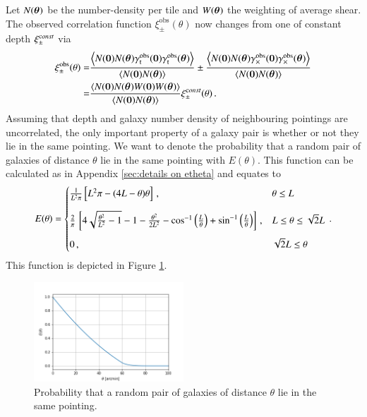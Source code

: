 Let $N(\b \theta)$ be the number-density per tile and $W(\b \theta)$ the weighting of average shear. The observed correlation function $\xi^{\text{obs}}_\pm(\theta)$ now changes from one of constant depth $\xi_\pm^{\rm const}$ via 
\begin{align*}
\xi^{\text{obs}}_\pm(\theta) = & \frac{\la N(\b 0)N(\b \theta)\gammao_{\rm t}(\b 0)\gammao_{\rm t}(\b \theta)\ra }{\la N(\b 0)N(\b \theta)\ra} \pm \frac{\la N(\b 0)N(\b \theta)\gammao_\times(\b 0)\gammao_\times(\b \theta)\ra }{\la N(\b 0)N(\b \theta)\ra} \\
 = & \frac{\la N(\b 0)N(\b \theta)W(\b 0)W(\b \theta)\ra}{\la N(\b 0)N(\b \theta)\ra} \xi_{\pm}^{\rm const}(\theta) \, .
 \end{align*}
 Assuming that depth and galaxy number density of neighbouring pointings are uncorrelated, the only important property of a galaxy pair is whether or not they lie in the same pointing. We want to denote the probability that a random pair of galaxies of distance $\theta$ lie in the same pointing with $E(\theta)$. This function can be calculated as in Appendix \ref{sec:details on etheta} and equates to
\begin{equation}
E(\theta) =  \begin{cases}
\frac{1}{L^2 \pi}\left[L^2\pi - (4L-\theta) \theta\right]\, ,  & \theta \leq L \\[10pt]
\frac{2}{\pi}\,\left[4\sqrt{\frac{\theta^2}{L^2}-1} -1 - \frac{\theta^2}{2L^2} - \cos\inv\left(\frac{L}{\theta}\right) + \sin\inv\left(\frac{L}{\theta}\right)\right]\, ,  & L  \leq \theta \leq \sqrt{2}L \\[10pt]
0\, ,  & \sqrt{2}L \leq \theta
\end{cases}\, .
\end{equation} 
 This function is depicted in Figure \ref{fig:eoftheta_lin}. 
 
 \begin{figure}
 \centering
 \includegraphics[width=0.5\textwidth]{images/eoftheta.png}
 \caption{Probability that a random pair of galaxies of distance $\theta$ lie in the same pointing.}
 \label{fig:eoftheta_lin}
 \end{figure}

